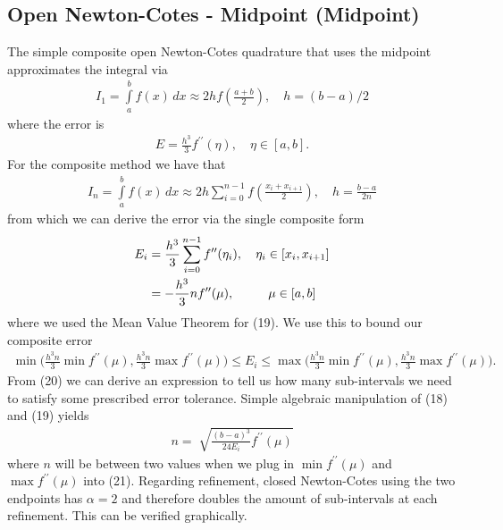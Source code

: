 \documentclass[12pt]{article}
\theoremstyle{remark}
\begin{document}
\subsection{Open Newton-Cotes - Midpoint (Midpoint)}

The simple composite open Newton-Cotes quadrature that uses the midpoint approximates the integral via
\begin{align}
I_1 = \displaystyle\int\limits_a^b f(x) \, dx \approx 2hf(\frac{a+b}{2}), \quad h = (b - a)/2
\end{align}
where the error is 
\begin{align}
E = \frac{h^3}{3}f^{\prime\prime}(\eta), \quad \eta \in [a,b].
\end{align}
For the composite method we have that 
\begin{align}
I_n = \displaystyle\int\limits_a^b f(x) \, dx \approx 2h\sum\limits_{i=0}^{n-1}f(\frac{x_i + x_{i+1}}{2}), \quad h = \frac{b-a}{2n}
\end{align}
from which we can derive the error via the single composite form 
\begin{align}
E_i & = \frac{h^3}{3}\sum\limits_{i=0}^{n-1} f^{\prime\prime}(\eta_i), \quad \eta_i \in [x_i, x_{i+1}] \\
& = -\frac{h^3}{3}nf^{\prime\prime}(\mu), \quad \hskip 0.6cm \mu \in [a,b]
\end{align}
where we used the Mean Value Theorem for (19). We use this to bound our composite error 
\begin{align}
\min\bigg(\frac{h^3n}{3}\min f^{\prime\prime}(\mu),\frac{h^3n}{3}\max f^{\prime\prime}(\mu) \bigg) \leq E_i \leq \max\bigg(\frac{h^3n}{3}\min f^{\prime\prime}(\mu),\frac{h^3n}{3}\max f^{\prime\prime}(\mu) \bigg).
\end{align}
From (20) we can derive an expression to tell us how many sub-intervals we need to satisfy some prescribed error tolerance. Simple algebraic manipulation of (18) and (19) yields
\begin{align}
n = \sqrt[]{\frac{(b-a)^3}{24E_i}f^{\prime\prime}(\mu)}
\end{align}
where $n$ will be between two values when we plug in $\min f^{\prime\prime}(\mu)$ and $\max f^{\prime\prime}(\mu)$ into (21).
Regarding refinement, closed Newton-Cotes using the two endpoints has $\alpha = 2$ and therefore doubles the amount of sub-intervals at each refinement. This can be verified graphically.
\end{document}

